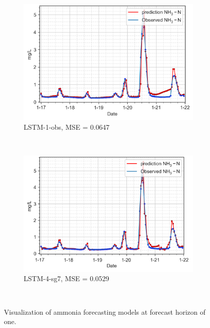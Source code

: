 \begin{figure}[!ht]
  \centering
  \begin{subfigure}[t]{0.75\textwidth}
    \includegraphics[width=\linewidth]{imgs/results/steps/nh3-lstm-1-fc1.png}
    \caption{LSTM-1-obs, MSE = 0.0647} \label{fig:nh3-lstm-1-fc1}
  \end{subfigure}\\
  \vspace{2em}
  \begin{subfigure}[t]{0.75\textwidth}
    \includegraphics[width=\linewidth]{imgs/results/steps/nh3-lstm-4-fc1.png}
    \caption{LSTM-4-sg7, MSE = 0.0529} \label{fig:nh3-lstm-4-fc1}
  \end{subfigure}\\
\caption{Visualization of ammonia forecasting models at forecast horizon of one.} \label{fig:nh3-forecast-fc1}
\end{figure}

